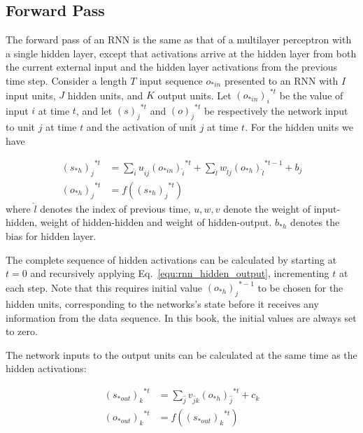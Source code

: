 \documentclass[runningheads,openany]{xhlPaper}
\begin{document}
\subsection{Forward Pass}
The forward pass of an RNN is the same as that of a multilayer perceptron with a single hidden layer, except that activations arrive at the hidden layer from both the current external input and the hidden layer activations from the previous time step.
Consider a length $T$ input sequence $o_{*in}$ presented to an RNN with $I$ input units, $J$ hidden units, and $K$ output units. Let ${\left( {{o_{*in}}} \right)_i}^{*t}$ be the value of input $i$ at time $t$, and let ${\left( {{s}} \right)_j}^{*t}$ and ${\left( {{o}} \right)_j}^{*t}$ be respectively the network input to unit $j$ at time $t$ and the activation of unit $j$ at time $t$. For the hidden units we have

\begin{equation}
\label{equ:rnn_hidden_output}
\begin{aligned}
{\left( {{s_{*h}}} \right)_j}^{*t} &= \sum\limits_{\hat i} {{u_{\hat ij}}{{\left( {{o_{*in}}} \right)}_{\hat i}}^{*t}}  + \sum\limits_{\hat l} {{w_{\hat lj}}{{\left( {{o_{*h}}} \right)}_{\hat l}}^{*t - 1}}  + {b_j}\\
{\left( {{o_{*h}}} \right)_j}^{*t} &= f\left( {{{\left( {{s_{*h}}} \right)}_j}^{*t}} \right)
\end{aligned}
\end{equation}
where $\hat l$ denotes the index of previous time, $u, w, v$ denote the weight of input-hidden, weight of hidden-hidden and weight of hidden-output. $b_{*h}$ denotes the bias for hidden layer.

The complete sequence of hidden activations can be calculated by starting at $t = 0$ and recursively applying Eq.~\ref{equ:rnn_hidden_output}, incrementing $t$ at each step.
Note that this requires initial value ${{{\left( {{o_{*h}}} \right)}_j}^{*-1}}$ to be chosen for the hidden units, corresponding to the networks's state before it receives any information from the data sequence.
In this book, the initial values are always set to zero.

The network inputs to the output units can be calculated at the same time as the hidden activations:

\begin{equation}
\label{equ:rnn_output_layer_output}
\begin{aligned}
{\left( {{s_{*out}}} \right)_k}^{*t} &= \sum\limits_{\hat j} {{v_{\hat jk}}{{\left( {{o_{*h}}} \right)}_{\hat j}}^{*t}}  + {c_k}\\
{\left( {{o_{*out}}} \right)_k}^{*t} &= f\left( {{{\left( {{s_{*out}}} \right)}_k}^{*t}} \right)
\end{aligned}
\end{equation}
\end{document}
